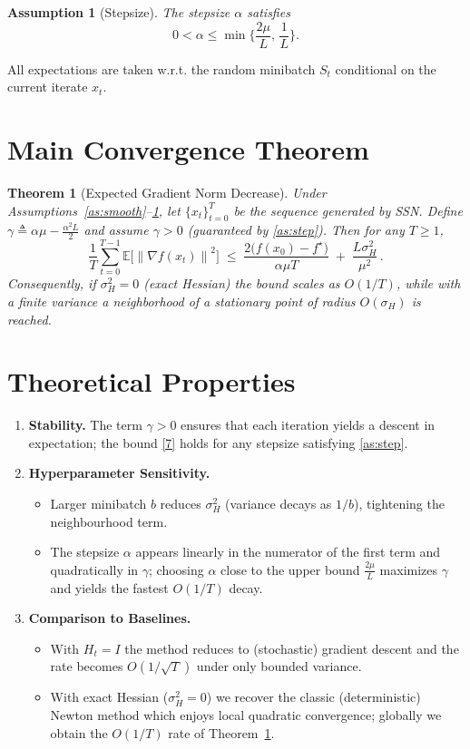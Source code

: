 \documentclass{article}
\newtheorem{theorem}{Theorem}
\newtheorem{assumption}{Assumption}
\newcommand{\E}{\mathbb{E}}
\newcommand{\norm}[1]{\left\|#1\right\|}
\newcommand{\grad}{\nabla}
\begin{document}
\begin{assumption}[Stepsize]\label{as:step}
The stepsize $\alpha$ satisfies
\[
    0<\alpha\le \min\Big\{\frac{2\mu}{L},\,\frac{1}{L}\Big\}.
\tag{6}
\]
\end{assumption}

All expectations are taken w.r.t. the random minibatch $S_t$ conditional on the current iterate $x_t$.

\section*{Main Convergence Theorem}
\begin{theorem}[Expected Gradient Norm Decrease]\label{thm:main}
Under Assumptions~\ref{as:smooth}--\ref{as:step}, let $\{x_t\}_{t=0}^T$ be the sequence generated by SSN.  
Define $\gamma\triangleq \alpha\mu-\frac{\alpha^2 L}{2}$ and assume $\gamma>0$ (guaranteed by \eqref{as:step}).  
Then for any $T\ge1$,
\[
    \frac{1}{T}\sum_{t=0}^{T-1}\E\big[\norm{\grad f(x_t)}^2\big]
    \;\le\;
    \frac{2\big(f(x_0)-f^\star\big)}{\alpha\mu T}
    \;+\;
    \frac{L\sigma_H^2}{\mu^2}\, .
\tag{7}
\]
Consequently, if $\sigma_H^2=0$ (exact Hessian) the bound scales as $O(1/T)$, while with a finite variance a neighborhood of a stationary point of radius $O(\sigma_H)$ is reached.
\end{theorem}

\section*{Theoretical Properties}
\begin{enumerate}[label=\arabic*.]
    \item \textbf{Stability.} The term $\gamma>0$ ensures that each iteration yields a descent in expectation; the bound \eqref{7} holds for any stepsize satisfying \eqref{as:step}.
    \item \textbf{Hyperparameter Sensitivity.}
    \begin{itemize}
        \item Larger minibatch $b$ reduces $\sigma_H^2$ (variance decays as $1/b$), tightening the neighbourhood term.
        \item The stepsize $\alpha$ appears linearly in the numerator of the first term and quadratically in $\gamma$; choosing $\alpha$ close to the upper bound $\frac{2\mu}{L}$ maximizes $\gamma$ and yields the fastest $O(1/T)$ decay.
    \end{itemize}
    \item \textbf{Comparison to Baselines.}
    \begin{itemize}
        \item With $H_t=I$ the method reduces to (stochastic) gradient descent and the rate becomes $O(1/\sqrt{T})$ under only bounded variance.
        \item With exact Hessian ($\sigma_H^2=0$) we recover the classic (deterministic) Newton method which enjoys local quadratic convergence; globally we obtain the $O(1/T)$ rate of Theorem~\ref{thm:main}.
    \end{itemize}
\end{enumerate}
\end{document}
